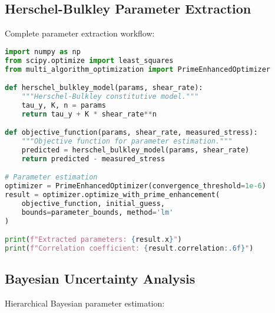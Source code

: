 \documentclass[11pt,a4paper]{article}
\begin{document}
\subsection{Herschel-Bulkley Parameter Extraction}
\label{subsec:hb_example}

Complete parameter extraction workflow:

\begin{lstlisting}[language=Python, caption=Herschel-Bulkley Parameter Extraction]
import numpy as np
from scipy.optimize import least_squares
from multi_algorithm_optimization import PrimeEnhancedOptimizer

def herschel_bulkley_model(params, shear_rate):
    """Herschel-Bulkley constitutive model."""
    tau_y, K, n = params
    return tau_y + K * shear_rate**n

def objective_function(params, shear_rate, measured_stress):
    """Objective function for parameter estimation."""
    predicted = herschel_bulkley_model(params, shear_rate)
    return predicted - measured_stress

# Parameter estimation
optimizer = PrimeEnhancedOptimizer(convergence_threshold=1e-6)
result = optimizer.optimize_with_prime_enhancement(
    objective_function, initial_guess,
    bounds=parameter_bounds, method='lm'
)

print(f"Extracted parameters: {result.x}")
print(f"Correlation coefficient: {result.correlation:.6f}")
\end{lstlisting}

\subsection{Bayesian Uncertainty Analysis}
\label{subsec:bayesian_example}

Hierarchical Bayesian parameter estimation:
\end{document}
